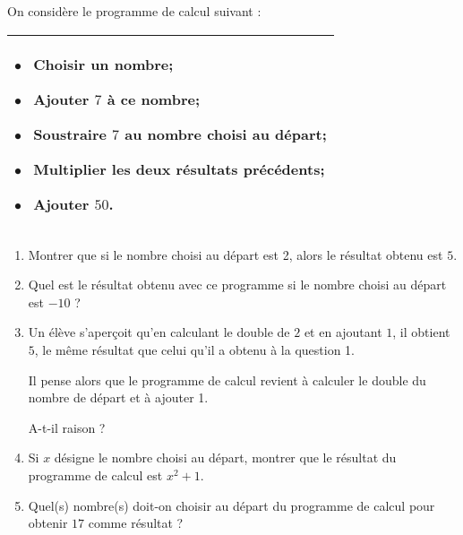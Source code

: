 
\medskip
 
 On considère le programme de calcul suivant :
 
\begin{center}
\begin{tabularx}{0.65\linewidth}{|X|}\hline
$\bullet~~$ Choisir un nombre;

$\bullet~~$ Ajouter $7$ à ce nombre;

$\bullet~~$ Soustraire $7$ au nombre choisi au départ;

$\bullet~~$ Multiplier les deux résultats précédents;

$\bullet~~$ Ajouter $50$.\\ \hline
\end{tabularx}
\end{center}

\medskip

\begin{enumerate}
\item Montrer que si le nombre choisi au départ est 2, alors le résultat obtenu est $5$.
\item Quel est le résultat obtenu avec ce programme si le nombre choisi au départ est $-10$ ?
\item Un élève s'aperçoit qu'en calculant le double de $2$ et en ajoutant $1$, il obtient $5$, le même résultat que celui qu'il a obtenu à la question 1.

Il pense alors que le programme de calcul revient à calculer le double du nombre de départ et à ajouter 1.

A-t-il raison ?
\item Si $x$ désigne le nombre choisi au départ, montrer que le résultat du programme de calcul est $x^2 + 1$.
\item Quel(s) nombre(s) doit-on choisir au départ du programme de calcul pour obtenir $17$ comme résultat ?
\end{enumerate}

\bigskip

